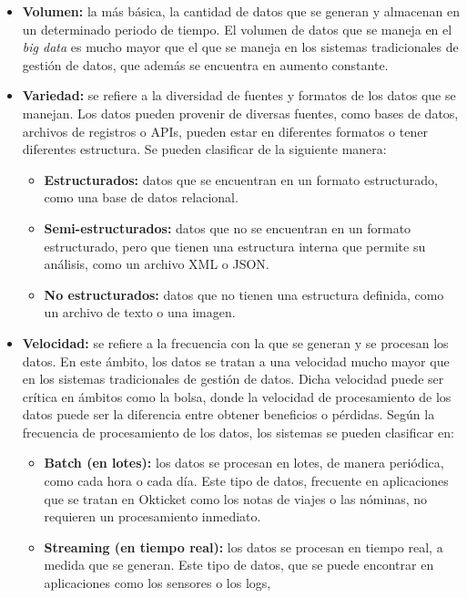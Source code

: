 \begin{itemize}
	\item \textbf{Volumen:} la más básica, la cantidad de datos que se generan y
		almacenan en un determinado periodo de tiempo. El volumen de datos que
		se maneja en el \textit{big data} es mucho mayor que el que se maneja en
		los sistemas tradicionales de gestión de datos, que además se encuentra
		en aumento constante.
	\item \textbf{Variedad:} se refiere a la diversidad de fuentes y formatos de
		los datos que se manejan. Los datos pueden provenir de diversas fuentes,
		como bases de datos, archivos de registros o APIs, pueden estar en
		diferentes formatos o tener diferentes estructura. Se pueden clasificar
		de la siguiente manera: \begin{itemize}
			\item \textbf{Estructurados:} datos que se encuentran en un formato
				estructurado, como una base de datos relacional.
			\item \textbf{Semi-estructurados:} datos que no se encuentran en un
				formato estructurado, pero que tienen una estructura interna
				que permite su análisis, como un archivo XML o JSON.
			\item \textbf{No estructurados:} datos que no tienen una estructura
				definida, como un archivo de texto o una imagen.
		\end{itemize}
	\item \textbf{Velocidad:} se refiere a la frecuencia con la que se generan y
		se procesan los datos. En este ámbito, los datos se tratan a una
		velocidad mucho mayor que en los sistemas tradicionales de gestión de
		datos. Dicha velocidad puede ser crítica en ámbitos como la bolsa,
		donde la velocidad de procesamiento de los datos puede ser la
		diferencia entre obtener beneficios o pérdidas. Según la frecuencia de
		procesamiento de los datos, los sistemas se pueden clasificar en:
		\begin{itemize}
			\item \textbf{Batch (en lotes):} los datos se procesan en lotes, de
				manera periódica, como cada hora o cada día. Este tipo de datos,
				frecuente en aplicaciones que se tratan en Okticket como los
				notas de viajes o las nóminas, no requieren un procesamiento
				inmediato.
			\item \textbf{Streaming (en tiempo real):} los datos se procesan en
				tiempo real, a medida que se generan. Este tipo de datos, que se
				puede encontrar en aplicaciones como los sensores o los logs,

\end{itemize}
\end{itemize}
